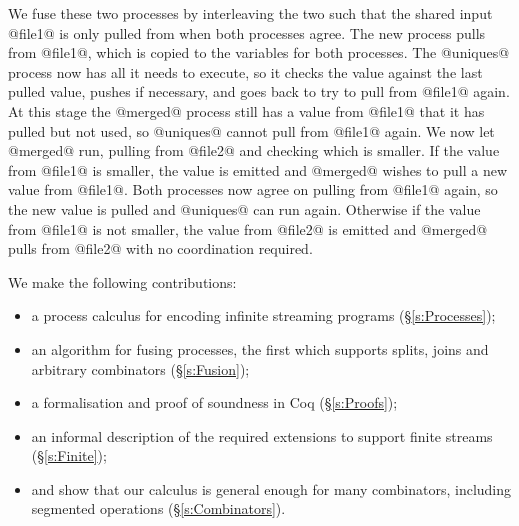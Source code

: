 We fuse these two processes by interleaving the two such that the shared input @file1@ is only pulled from when both processes agree.
The new process pulls from @file1@, which is copied to the variables for both processes.
The @uniques@ process now has all it needs to execute, so it checks the value against the last pulled value, pushes if necessary, and goes back to try to pull from @file1@ again.
At this stage the @merged@ process still has a value from @file1@ that it has pulled but not used, so @uniques@ cannot pull from @file1@ again.
We now let @merged@ run, pulling from @file2@ and checking which is smaller.
If the value from @file1@ is smaller, the value is emitted and @merged@ wishes to pull a new value from @file1@.
Both processes now agree on pulling from @file1@ again, so the new value is pulled and @uniques@ can run again.
Otherwise if the value from @file1@ is not smaller, the value from @file2@ is emitted and @merged@ pulls from @file2@ with no coordination required.


We make the following contributions:
\begin{itemize}
\item a process calculus for encoding infinite streaming programs (\S\ref{s:Processes});
\item an algorithm for fusing processes, the first which supports splits, joins and arbitrary combinators (\S\ref{s:Fusion});
\item a formalisation and proof of soundness in Coq (\S\ref{s:Proofs});
\item an informal description of the required extensions to support finite streams (\S\ref{s:Finite});
\item and show that our calculus is general enough for many combinators, including segmented operations (\S\ref{s:Combinators}).
\end{itemize}


